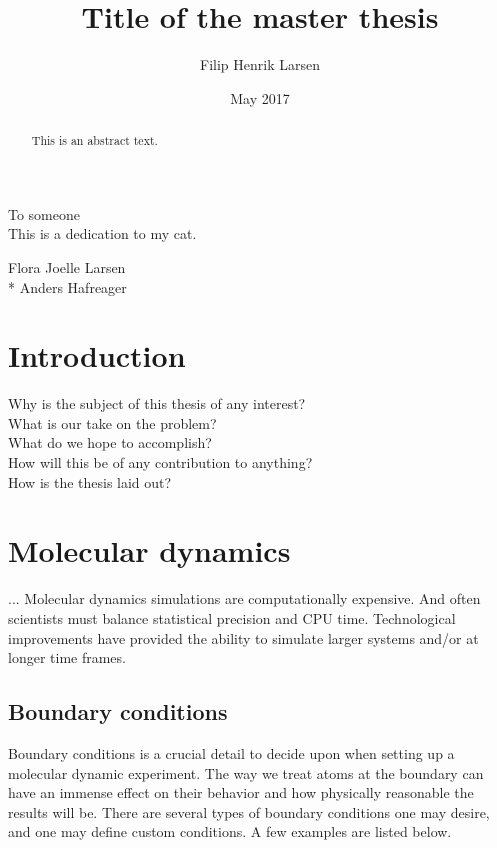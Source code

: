 \documentclass[twoside,english]{uiofysmaster}
\author{Filip Henrik Larsen}
\title{Title of the master thesis}
\date{May 2017}
\begin{document}
\maketitle

\begin{abstract}
This is an abstract text.
\end{abstract}

\begin{dedication}
  To someone
  \\\vspace{12pt}
  This is a dedication to my cat.
\end{dedication}

\begin{acknowledgements}
  Flora Joelle Larsen\\*
  Anders Hafreager
\end{acknowledgements}

\tableofcontents

\chapter{Introduction}

Why is the subject of this thesis of any interest?\\
What is our take on the problem?\\
What do we hope to accomplish?\\
How will this be of any contribution to anything?\\
How is the thesis laid out?


\chapter{Molecular dynamics}
...
Molecular dynamics simulations are computationally expensive. And often scientists must balance statistical precision and CPU time. Technological improvements have provided the ability to simulate larger systems and/or at longer time frames. 

\section{Boundary conditions}
Boundary conditions is a crucial detail to decide upon when setting up a molecular dynamic experiment. The way we treat atoms at the boundary can have an immense effect on their behavior and how physically reasonable the results will be. There are several types of boundary conditions one may desire, and one may define custom conditions. A few examples are listed below. 
\end{document}
